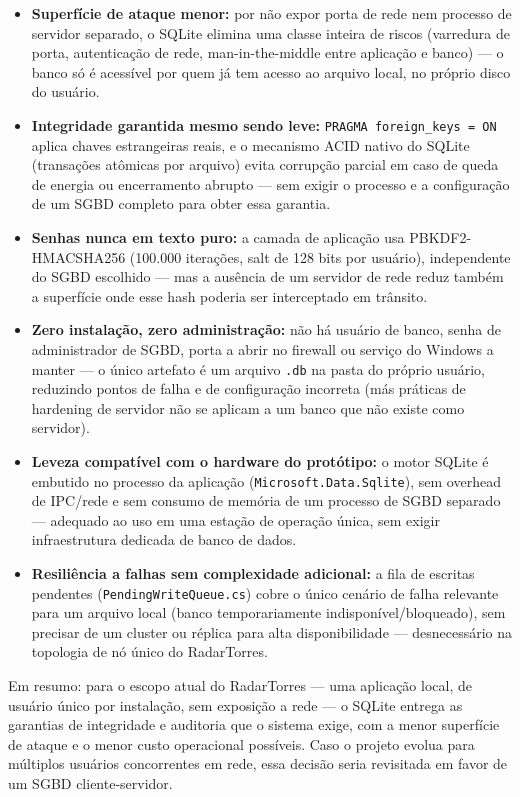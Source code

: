\begin{itemize}
  \item \textbf{Superfície de ataque menor:} por não expor porta de rede nem processo de servidor
  separado, o SQLite elimina uma classe inteira de riscos (varredura de porta, autenticação de
  rede, man-in-the-middle entre aplicação e banco) — o banco só é acessível por quem já tem acesso
  ao arquivo local, no próprio disco do usuário.
  \item \textbf{Integridade garantida mesmo sendo leve:} \texttt{PRAGMA foreign\_keys = ON} aplica
  chaves estrangeiras reais, e o mecanismo ACID nativo do SQLite (transações atômicas por arquivo)
  evita corrupção parcial em caso de queda de energia ou encerramento abrupto — sem exigir o
  processo e a configuração de um SGBD completo para obter essa garantia.
  \item \textbf{Senhas nunca em texto puro:} a camada de aplicação usa PBKDF2-HMACSHA256
  (100.000 iterações, salt de 128 bits por usuário), independente do SGBD escolhido — mas a
  ausência de um servidor de rede reduz também a superfície onde esse hash poderia ser
  interceptado em trânsito.
  \item \textbf{Zero instalação, zero administração:} não há usuário de banco, senha de
  administrador de SGBD, porta a abrir no firewall ou serviço do Windows a manter — o único
  artefato é um arquivo \texttt{.db} na pasta do próprio usuário, reduzindo pontos de falha e de
  configuração incorreta (más práticas de hardening de servidor não se aplicam a um banco que não
  existe como servidor).
  \item \textbf{Leveza compatível com o hardware do protótipo:} o motor SQLite é embutido no
  processo da aplicação (\texttt{Microsoft.Data.Sqlite}), sem overhead de IPC/rede e sem consumo
  de memória de um processo de SGBD separado — adequado ao uso em uma estação de operação única,
  sem exigir infraestrutura dedicada de banco de dados.
  \item \textbf{Resiliência a falhas sem complexidade adicional:} a fila de escritas pendentes
  (\texttt{PendingWriteQueue.cs}) cobre o único cenário de falha relevante para um arquivo local
  (banco temporariamente indisponível/bloqueado), sem precisar de um cluster ou réplica para
  alta disponibilidade — desnecessário na topologia de nó único do RadarTorres.
\end{itemize}

Em resumo: para o escopo atual do RadarTorres — uma aplicação local, de usuário único por
instalação, sem exposição a rede — o SQLite entrega as garantias de integridade e auditoria que
o sistema exige, com a menor superfície de ataque e o menor custo operacional possíveis. Caso o
projeto evolua para múltiplos usuários concorrentes em rede, essa decisão seria revisitada em
favor de um SGBD cliente-servidor.

